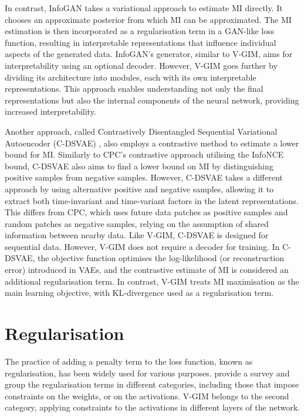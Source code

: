 	In contrast, InfoGAN \citep{chenInfoGANInterpretableRepresentation2016} takes a variational approach to estimate MI directly. It chooses an approximate posterior from which MI can be approximated. The MI estimation is then incorporated as a regularisation term in a GAN-like loss function, resulting in interpretable representations that influence individual aspects of the generated data. InfoGAN's generator, similar to V-GIM, aims for interpretability using an optional decoder. However, V-GIM goes further by dividing its architecture into modules, each with its own interpretable representations. This approach enables understanding not only the final representations but also the internal components of the neural network, providing increased interpretability.
	
	
	Another approach, called Contrastively Disentangled Sequential Variational Autoencoder (C-DSVAE) \citep{baiContrastivelyDisentangledSequential2021}, also employs a contrastive method to estimate a lower bound for MI. Similarly to CPC's contrastive approach utilising the InfoNCE bound, C-DSVAE also aims to find a lower bound on MI by distinguishing positive samples from negative samples. However, C-DSVAE takes a different approach by using alternative positive and negative samples, allowing it to extract both time-invariant and time-variant factors in the latent representations. This differs from CPC, which uses future data patches as positive samples and random patches as negative samples, relying on the assumption of shared information between nearby data. Like V-GIM, C-DSVAE is designed for sequential data. However, V-GIM does not require a decoder for training. In C-DSVAE, the objective function optimises the log-likelihood (or reconstruction error) introduced in VAEs, and the contrastive estimate of MI is considered an additional regularisation term. In contrast, V-GIM treats MI maximisation as the main learning objective, with KL-divergence used as a regularisation term.
	
	
	

	
	
	

\section{Regularisation}
	The practice of adding a penalty term to the loss function, known as regularisation, has been widely used for various purposes. \cite{kukackaRegularizationDeepLearning2017} provide a survey and group the regularisation terms in different categories, including those that impose constraints on the weights, or on the activations. V-GIM belongs to the second category, applying constraints to the activations in different layers of the network.
	
